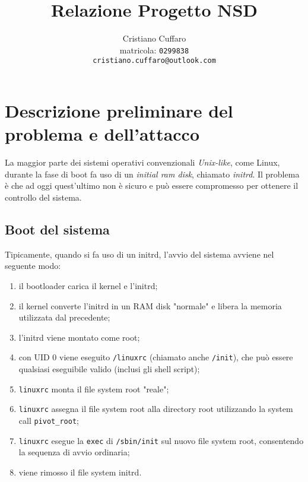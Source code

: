 \documentclass{article}
\begin{document}
\author{%
	Cristiano Cuffaro \\
	{\small matricola: \texttt{0299838}} \\
	{\small \texttt{cristiano.cuffaro@outlook.com}}
}
\title{Relazione Progetto NSD}

\begin{titlingpage}		
	\maketitle
	\tableofcontents
\end{titlingpage}

\newpage

\section{Descrizione preliminare del problema e dell'attacco}
La maggior parte dei sistemi operativi convenzionali \textsl{Unix-like}, come Linux, durante la fase di boot fa uso di un \textsl{initial ram disk}, chiamato \textsl{initrd}. Il problema è che ad oggi quest'ultimo non è sicuro e può essere compromesso per ottenere il controllo del sistema.

\subsection{Boot del sistema}
Tipicamente, quando si fa uso di un initrd, l'avvio del sistema avviene nel seguente modo:
\begin{enumerate}
	\item il bootloader carica il kernel e l'initrd;
	\item il kernel converte l'initrd in un RAM disk "normale" e libera la memoria utilizzata dal precedente;
	\item l'initrd viene montato come root;
	\item con UID 0 viene eseguito \texttt{/linuxrc} (chiamato anche \texttt{/init}), che può essere qualsiasi eseguibile valido (inclusi gli shell script);
	\item \texttt{linuxrc} monta il file system root "reale";
	\item \texttt{linuxrc} assegna il file system root alla directory root utilizzando la system call \texttt{pivot\_root};
	\item \texttt{linuxrc} esegue la \texttt{exec} di \texttt{/sbin/init} sul nuovo file system root, consentendo la sequenza di avvio ordinaria;
	\item viene rimosso il file system initrd.
\end{enumerate}
\end{document}
